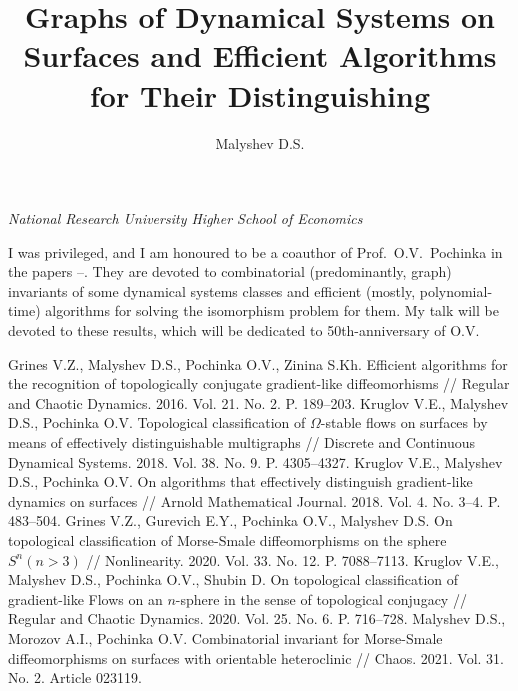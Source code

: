 \documentclass[12pt]{article}
\title{\bf\Large Graphs of Dynamical Systems on Surfaces and Efficient Algorithms for Their Distinguishing}
\author{Malyshev D.S.}
\date{}
\begin{document}
\begin{center}
	\maketitle
	{\large\textit{National Research University Higher School of Economics}}
\end{center}

I was privileged, and I am honoured to be a coauthor of \mbox{Prof. O.V. Pochinka} in the papers \cite{GMPZ16}--\cite{MMP21}.
They are devoted to combinatorial (predominantly, graph) invariants of some dynamical systems classes and efficient (mostly, polynomial-time) 
algorithms for solving the isomorphism problem for them. My talk will be devoted to these results, which will be dedicated to 50th-anniversary
of O.V. 


\begin{thebibliography}{99}
 Grines V.Z., Malyshev D.S., Pochinka O.V., Zinina S.Kh. Efficient algorithms for the recognition of topologically conjugate gradient-like diffeomorhisms // Regular and Chaotic Dynamics. 2016. Vol. 21. No. 2. P. 189--203.
 Kruglov V.E., Malyshev D.S., Pochinka O.V. Topological classification of $\Omega$-stable flows on surfaces by means of effectively distinguishable multigraphs // Discrete and Continuous Dynamical Systems. 2018. Vol. 38. No. 9. P. 4305--4327.
 Kruglov V.E., Malyshev D.S., Pochinka O.V. On algorithms that effectively distinguish gradient-like dynamics on surfaces // Arnold Mathematical Journal. 2018. Vol. 4. No. 3--4. P. 483--504.
 Grines V.Z., Gurevich E.Y., Pochinka O.V., Malyshev D.S. On topological classification of Morse-Smale diffeomorphisms on the sphere $S^n(n>3)$ // Nonlinearity. 2020. Vol. 33. No. 12. P. 7088--7113.
 Kruglov V.E., Malyshev D.S., Pochinka O.V., Shubin D. On topological classification of gradient-like Flows on an $n$-sphere in the sense of topological conjugacy // Regular and Chaotic Dynamics. 2020. Vol. 25. No. 6. P. 716--728.
 Malyshev D.S., Morozov A.I., Pochinka O.V. Combinatorial invariant for Morse-Smale diffeomorphisms on surfaces with orientable heteroclinic // Chaos. 2021. Vol. 31. No. 2. Article 023119.
\end{thebibliography}
\end{document}
